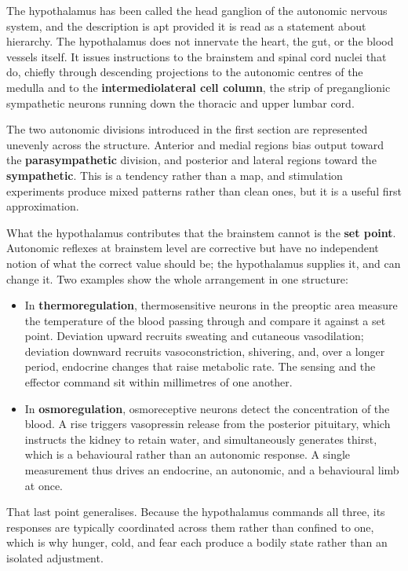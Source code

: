 \documentclass[11pt]{article}
\begin{document}
The hypothalamus has been called the head ganglion of the autonomic nervous system, and the description is apt provided it is read as a statement about hierarchy. The hypothalamus does not innervate the heart, the gut, or the blood vessels itself. It issues instructions to the brainstem and spinal cord nuclei that do, chiefly through descending projections to the autonomic centres of the medulla and to the \textbf{intermediolateral cell column}, the strip of preganglionic sympathetic neurons running down the thoracic and upper lumbar cord.

The two autonomic divisions introduced in the first section are represented unevenly across the structure. Anterior and medial regions bias output toward the \textbf{parasympathetic} division, and posterior and lateral regions toward the \textbf{sympathetic}. This is a tendency rather than a map, and stimulation experiments produce mixed patterns rather than clean ones, but it is a useful first approximation.

What the hypothalamus contributes that the brainstem cannot is the \textbf{set point}. Autonomic reflexes at brainstem level are corrective but have no independent notion of what the correct value should be; the hypothalamus supplies it, and can change it. Two examples show the whole arrangement in one structure:

\begin{itemize}
    \item In \textbf{thermoregulation}, thermosensitive neurons in the preoptic area measure the temperature of the blood passing through and compare it against a set point. Deviation upward recruits sweating and cutaneous vasodilation; deviation downward recruits vasoconstriction, shivering, and, over a longer period, endocrine changes that raise metabolic rate. The sensing and the effector command sit within millimetres of one another.
    \item In \textbf{osmoregulation}, osmoreceptive neurons detect the concentration of the blood. A rise triggers vasopressin release from the posterior pituitary, which instructs the kidney to retain water, and simultaneously generates thirst, which is a behavioural rather than an autonomic response. A single measurement thus drives an endocrine, an autonomic, and a behavioural limb at once.
\end{itemize}

That last point generalises. Because the hypothalamus commands all three, its responses are typically coordinated across them rather than confined to one, which is why hunger, cold, and fear each produce a bodily state rather than an isolated adjustment.
\end{document}
